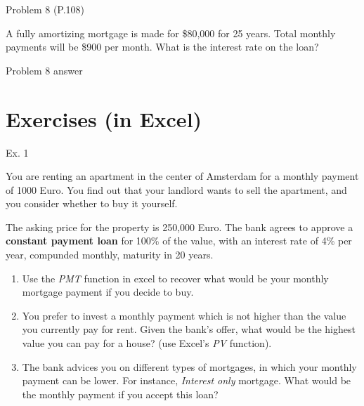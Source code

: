 \documentclass[ignorenonframetext,]{beamer}
\newenvironment{Shaded}{\begin{snugshade}}{\end{snugshade}}
\newcommand{\KeywordTok}[1]{\textcolor[rgb]{0.13,0.29,0.53}{\textbf{{#1}}}}
\newcommand{\DecValTok}[1]{\textcolor[rgb]{0.00,0.00,0.81}{{#1}}}
\newcommand{\StringTok}[1]{\textcolor[rgb]{0.31,0.60,0.02}{{#1}}}
\newcommand{\CommentTok}[1]{\textcolor[rgb]{0.56,0.35,0.01}{\textit{{#1}}}}
\newcommand{\NormalTok}[1]{{#1}}
\providecommand{\tightlist}{%
\setlength{\itemsep}{0pt}\setlength{\parskip}{0pt}}
\begin{document}
\begin{frame}{Problem 8 (P.108)}

A fully amortizing mortgage is made for \$80,000 for 25 years. Total
monthly payments will be \$900 per month. What is the interest rate on
the loan?

\end{frame}

\begin{frame}[fragile]{Problem 8 answer}

\begin{Shaded}
\end{Shaded}

\end{frame}

\section{Exercises (in Excel)}\label{exercises-in-excel}

\begin{frame}{Ex. 1}

\small

You are renting an apartment in the center of Amsterdam for a monthly
payment of 1000 Euro. You find out that your landlord wants to sell the
apartment, and you consider whether to buy it yourself.

The asking price for the property is 250,000 Euro. The bank agrees to
approve a \textbf{constant payment loan} for 100\% of the value, with an
interest rate of 4\% per year, compunded monthly, maturity in 20 years.

\begin{enumerate}
\def\labelenumi{\arabic{enumi}.}
\tightlist
\item
  Use the \emph{PMT} function in excel to recover what would be your
  monthly mortgage payment if you decide to buy.
\item
  You prefer to invest a monthly payment which is not higher than the
  value you currently pay for rent. Given the bank's offer, what would
  be the highest value you can pay for a house? (use Excel's \emph{PV}
  function).
\item
  The bank advices you on different types of mortgages, in which your
  monthly payment can be lower. For instance, \emph{Interest only}
  mortgage. What would be the monthly payment if you accept this loan?
\end{enumerate}

\normalsize

\end{frame}
\end{document}
